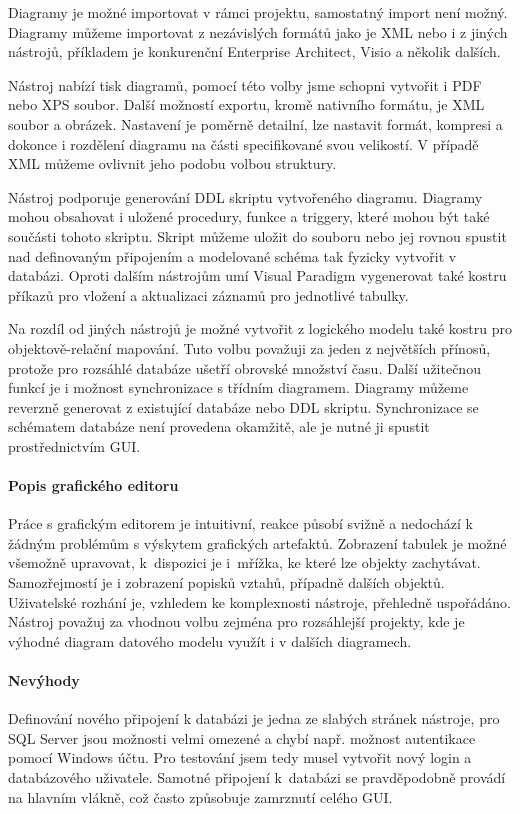 \documentclass[czech,bachelor,public,dept460,male,oneside]{diploma}
\begin{document}
		Diagramy je možné importovat v rámci projektu, samostatný import není možný. Diagramy můžeme importovat z nezávislých formátů jako je XML nebo i z jiných nástrojů, příkladem je konkurenční Enterprise Architect, Visio a několik dalších. 
		
		Nástroj nabízí tisk diagramů, pomocí této volby jsme schopni vytvořit i PDF nebo XPS soubor. Další možností exportu, kromě nativního formátu, je XML soubor a obrázek. Nastavení je poměrně detailní, lze nastavit formát, kompresi a dokonce i rozdělení diagramu na části specifikované svou velikostí. V případě XML můžeme ovlivnit jeho podobu volbou struktury.
		
		Nástroj podporuje generování DDL skriptu vytvořeného diagramu. Diagramy mohou obsahovat i uložené procedury, funkce a triggery, které mohou být také součásti  tohoto skriptu. Skript můžeme uložit do souboru nebo jej rovnou spustit nad definovaným připojením a modelované schéma tak fyzicky vytvořit v databázi. Oproti dalším nástrojům umí Visual Paradigm vygenerovat také kostru příkazů pro vložení a aktualizaci záznamů pro jednotlivé tabulky.
		
		Na rozdíl od jiných nástrojů je možné vytvořit z logického modelu také kostru pro objektově-relační mapování. Tuto volbu považuji za jeden z největších přínosů, protože pro rozsáhlé databáze ušetří obrovské množství času. Další užitečnou funkcí je i možnost synchronizace s třídním diagramem. Diagramy můžeme reverzně generovat z existující databáze nebo DDL skriptu. Synchronizace se schématem databáze není provedena okamžitě, ale je nutné ji spustit prostřednictvím GUI. 
		
		\paragraph{Popis grafického editoru}
		Práce s grafickým editorem je intuitivní, reakce působí svižně a nedochází k žádným problémům s výskytem grafických artefaktů. Zobrazení tabulek je možné všemožně upravovat, k~dispozici je i~mřížka, ke které lze objekty zachytávat. Samozřejmostí je i zobrazení popisků vztahů, případně dalších objektů. Uživatelské rozhání je, vzhledem ke komplexnosti nástroje, přehledně uspořádáno. Nástroj považuj za vhodnou volbu zejména pro rozsáhlejší projekty, kde je výhodné diagram datového modelu využít i v dalších diagramech.
		
		\paragraph{Nevýhody}
		Definování nového připojení k databázi je jedna ze slabých stránek nástroje, pro SQL Server jsou možnosti velmi omezené a chybí např. možnost autentikace pomocí Windows účtu. Pro testování jsem tedy musel vytvořit nový login a databázového uživatele. Samotné připojení k~databázi se pravděpodobně provádí na hlavním vlákně, což často způsobuje zamrznutí celého GUI.
		
\end{document}
